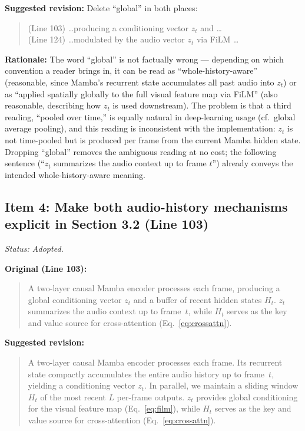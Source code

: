 \documentclass{article}
\begin{document}
\textbf{Suggested revision:}
Delete ``global'' in both places:
\begin{quote}
(Line 103) \ldots producing a conditioning vector $z_t$ and \ldots\\
(Line 124) \ldots modulated by the audio vector $z_t$ via FiLM \ldots
\end{quote}

\textbf{Rationale:}
The word ``global'' is not factually wrong --- depending on which convention a reader brings in, it can be read as ``whole-history-aware'' (reasonable, since Mamba's recurrent state accumulates all past audio into $z_t$) or as ``applied spatially globally to the full visual feature map via FiLM'' (also reasonable, describing how $z_t$ is used downstream). The problem is that a third reading, ``pooled over time,'' is equally natural in deep-learning usage (cf.\ global average pooling), and this reading is inconsistent with the implementation: $z_t$ is not time-pooled but is produced per frame from the current Mamba hidden state. Dropping ``global'' removes the ambiguous reading at no cost; the following sentence (``$z_t$ summarizes the audio context up to frame $t$'') already conveys the intended whole-history-aware meaning.

\subsection*{Item 4: Make both audio-history mechanisms explicit in Section 3.2 (Line 103)}

\textit{Status: Adopted.}

\textbf{Original (Line 103):}
\begin{quote}
A two-layer causal Mamba encoder processes each frame, producing a global conditioning vector $z_t$ and a buffer of recent hidden states $H_t$. $z_t$ summarizes the audio context up to frame~$t$, while $H_t$ serves as the key and value source for cross-attention (Eq.~\ref{eq:crossattn}).
\end{quote}

\textbf{Suggested revision:}
\begin{quote}
A two-layer causal Mamba encoder processes each frame. Its recurrent state compactly accumulates the entire audio history up to frame~$t$, yielding a conditioning vector $z_t$. In parallel, we maintain a sliding window $H_t$ of the most recent $L$ per-frame outputs. $z_t$ provides global conditioning for the visual feature map (Eq.~\ref{eq:film}), while $H_t$ serves as the key and value source for cross-attention (Eq.~\ref{eq:crossattn}).
\end{quote}
\end{document}
